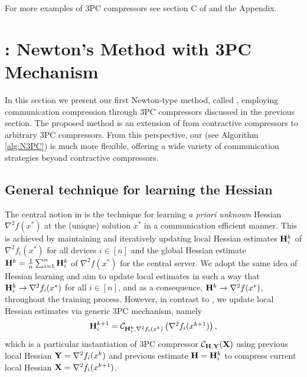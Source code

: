 \documentclass[11pt]{article}
\begin{document}
	For more examples of 3PC compressors see section C of \citep{richtarik3PC} and the Appendix.
	
	
	
	\section{: Newton's Method with 3PC Mechanism}\label{sec:N3PC}
	
	In this section we present our first Newton-type method, called , employing communication compression through 3PC compressors discussed in the previous section. The proposed method is an extension of  \citep{FedNL2021} from contractive compressors to arbitrary 3PC compressors. From this perspective, our  (see Algorithm \ref{alg:N3PC}) is much more flexible, offering a wide variety of communication strategies beyond contractive compressors.
	
	
	\subsection{General technique for learning the Hessian}
	The central notion in  is the technique for learning {\em a priori unknown} Hessian $\nabla^2 f(x^*)$ at the (unique) solution $x^*$ in a communication efficient manner. This is achieved by maintaining and iteratively updating local Hessian estimates $\mathbf{H}_i^k$ of $\nabla^2 f_i(x^*)$ for all devices $i\in[n]$ and the global Hessian estimate $\mathbf{H}^k = \frac{1}{n}\sum_{i=1}^n \mathbf{H}_i^k$ of $\nabla^2 f(x^*)$ for the central server.
	We adopt the same idea of Hessian learning and aim to update local estimates in such a way that $\mathbf{H}_i^k\to\nabla^2 f_i(x^*)$ for all $i\in[n]$, and as a consequence, $\mathbf{H}^k\to\nabla^2 f(x^*)$, throughout the training process. However, in contrast to , we update local Hessian estimates via generic 3PC mechanism, namely $$\textstyle\mathbf{H}_i^{k+1} = {\mathcal{C}}_{\mathbf{H}_i^k,\nabla^2f_i(x^k)}\left(\nabla^2f_i(x^{k+1})\right),$$
	which is a particular instantiation of 3PC compressor ${\mathcal{C}}_{\mathbf{H},\mathbf{Y}}(\mathbf{X})$ using previous local Hessian $\mathbf{Y} = \nabla^2 f_i(x^k)$ and previous estimate $\mathbf{H} = \mathbf{H}_i^k$ to compress current local Hessian $\mathbf{X} = \nabla^2 f_i(x^{k+1})$.
	
\end{document}
